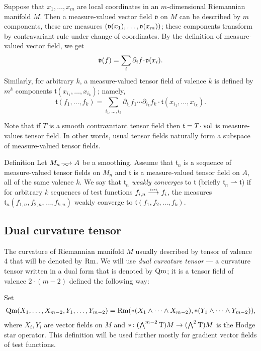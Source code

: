 Suppose that $x_1,\dots,x_m$ are local coordinates in an $m$-dimensional Riemannian manifold $M$.
Then a measure-valued vector field $\mathfrak{v}$ on $M$ can be described by $m$ components, these are measures $(\mathfrak{v}(x_1),\dots,\mathfrak{v}(x_m))$;
these components transform by contravariant rule under change of coordinates.
By the definition of measure-valued vector field, we get
\[\mathfrak{v}(f)=\sum_{i}\partial_i f\cdot \vv(x_i).\]
Similarly, for arbitrary $k$, a measure-valued tensor field of valence $k$ is defined by $m^k$ components 
$\mathfrak{t}(x_{i_1},\dots,x_{i_k})$; namely,
\[\mathfrak{t}(f_1,\dots,f_k)
=
\sum_{i_1,\dots,i_k}
\partial_{i_1} f_1 
\cdots 
\partial_{i_k} f_k
\cdot \mathfrak{t}(x_{i_1},\dots,x_{i_k}).\]

Note that if $T$ is a smooth contravariant tensor field then $\mathfrak{t}=T\cdot \vol$ is measure-values tensor field.
In other words, usual tensor fields naturally form a subspace of measure-valued tensor fields.

\begin{rdef} {Definition}
Let $M_n\smooths{} A$ be a smoothing.
Assume that $\mathfrak{t}_n$ is a sequence of %
 measure-valued tensor fields on $M_n$  and $\mathfrak{t}$ is a
measure-valued tensor field on $A$,
all of the same valence $k$.
We say that $\mathfrak{t}_n$ \emph{weakly converges} to  $\mathfrak{t}$
(briefly $\mathfrak{t}_n\rightharpoonup\mathfrak{t}$) if for arbitrary $k$
sequences of test functions
$f_{i,n}\stackrel{\text{\tiny\rm test}}{\longrightarrow} f_i$, the measures $\mathfrak{t}_n(f_{1,n},f_{2,n},\dots,f_{k,n})$ weakly converge to $\mathfrak{t}(f_{1},f_{2},\dots,f_{k})$.
\end{rdef}

\subsection{Dual curvature tensor}

The curvature of Riemannian manifold $M$ usually described by tensor of valence 4 that will be denoted by $\operatorname{\rm Rm}$.
We will use \emph{dual curvature tensor} --- 
a curvature tensor written in a dual form that is denoted by $\operatorname{\rm Qm}$;
it is a tensor field of valence $2\cdot(m-2)$ defined the following way:

Set
\begin{multline*}
\operatorname{\rm Qm}(X_1,\dots,X_{m-2},Y_1,\dots,Y_{m-2})
= 
\operatorname{\rm Rm}(*(X_1\wedge\dots\wedge X_{m-2}), *(Y_1\wedge\dots\wedge Y_{m-2})),
\end{multline*}
where $X_i,Y_i$ are vector fields on $M$ and  ${*}\colon(\bigwedge^{m-2}\mathrm{T})M\to(\bigwedge^2\mathrm{T})M$ is the  Hodge star operator.
This definition will be used further mostly for gradient vector fields of test functions.

